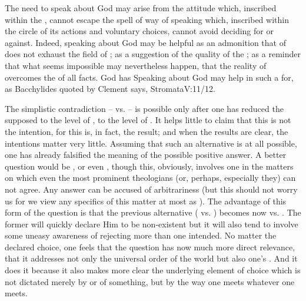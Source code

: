 \pa The need to speak about God may arise from the  attitude
which, inscribed within the \hoa, cannot escape the spell of  way
of speaking which, inscribed within the circle of its actions and voluntary
choices, cannot avoid deciding for or against. 
Indeed, speaking about God may be helpful as an admonition that
 of  does not exhaust the field of ;
as a suggestion of the quality of the ; as a reminder that
what seems impossible may nevertheless happen, that the reality of 
overcomes the  of all facts.  God has  Speaking about God may help in such a
 for, as Bacchylides quoted by Clement says, \citet{one becomes wise
  from another, both in past times and at present, for it is not very easy to
  find the portals of unutterable words. [...] We speak not
  as supplying His name; but [...] we use good names, in order that the mind may
  have these as points of support, so as not to err in other
  respects.}{Stromata}{V:11/12.}


The simplistic contradiction --  vs.  -- is
possible only after one has reduced the supposed  to the
level of , to the level of . It helps
little to claim that this is not the intention, for this is, in fact, the
result; and when the results are clear, the intentions matter very little. Assuming
that such an alternative is at all possible, one has already falsified the
meaning of the possible positive answer. 
%
A better question would be , or even , though this, obviously, involves one in the matters on which even
the most prominent theologians (or, perhaps, especially they) can not agree.
Any  answer can be accused of arbitrariness (but this should not
worry us for we view any specifics of this matter at most as ).
The advantage of this form of the question is that the previous alternative
( vs. ) becomes now  vs. . The former will quickly declare Him to be non-existent but
it will also tend to involve some uneasy awareness of rejecting more than one
intended.
%
No matter the declared choice, one feels that the question has now much more
direct relevance, that it addresses not only the universal order of the
 world but also one's . And it does it because it
also makes more clear the underlying element of choice which is not dictated
merely by   or  of something, but by the
way one meets whatever one meets.

